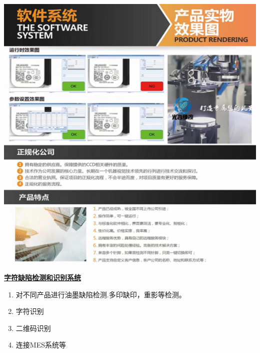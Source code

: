 \documentclass[lighthipster]{simplehipstercv}
\begin{document}
\begin{minipage}[t]{\textwidth}
\begin{minipage}[t]{\textwidth}
\begin{minipage}[thbp]{0.6\textwidth}
			\end{minipage}
			\bigskip
		\end{minipage}
		
		\vspace{2em}
		
		\begin{minipage}[thbp]{\textwidth}
			\begin{minipage}[thbp]{0.3\textwidth}
				\includegraphics[width=\linewidth]{PrjMy_2.png}
			\end{minipage} 
			\hfill
			\begin{minipage}[th]{0.6\textwidth}
				\textbf{\underline{字符缺陷检测和识别系统}}
				\begin{enumerate}
					\item 对不同产品进行油墨缺陷检测.多印缺印，重影等检测。
					\item 字符识别
					\item 二维码识别
					\item 连接MES系统等
				\end{enumerate}
				\vfill
				\vspace{5em}
			\end{minipage}
		\bigskip
		\end{minipage}
		
		\vspace{2em}
		

\end{minipage}
\end{document}
